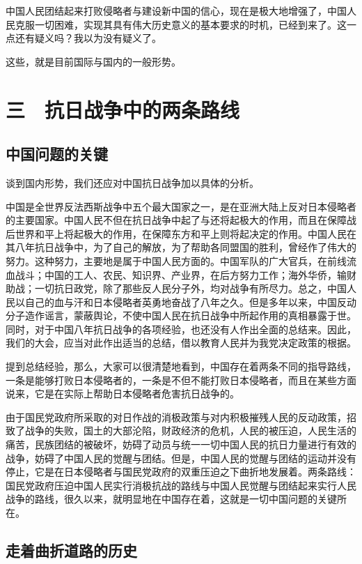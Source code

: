 中国人民团结起来打败侵略者与建设新中国的信心，现在是极大地增强了，中国人民克服一切困难，实现其具有伟大历史意义的基本要求的时机，已经到来了。这一点还有疑义吗？我以为没有疑义了。

这些，就是目前国际与国内的一般形势。

\section{三　抗日战争中的两条路线}

\subsection{中国问题的关键}

谈到国内形势，我们还应对中国抗日战争加以具体的分析。

中国是全世界反法西斯战争中五个最大国家之一，是在亚洲大陆上反对日本侵略者的主要国家。中国人民不但在抗日战争中起了与还将起极大的作用，而且在保障战后世界和平上将起极大的作用，在保障东方和平上则将起决定的作用。中国人民在其八年抗日战争中，为了自己的解放，为了帮助各同盟国的胜利，曾经作了伟大的努力。这种努力，主要地是属于中国人民方面的。中国军队的广大官兵，在前线流血战斗；中国的工人、农民、知识界、产业界，在后方努力工作；海外华侨，输财助战；一切抗日政党，除了那些反人民分子外，均对战争有所尽力。总之，中国人民以自己的血与汗和日本侵略者英勇地奋战了八年之久。但是多年以来，中国反动分子造作谣言，蒙蔽舆论，不使中国人民在抗日战争中所起作用的真相暴露于世。同时，对于中国八年抗日战争的各项经验，也还没有人作出全面的总结来。因此，我们的大会，应当对此作出适当的总结，借以教育人民并为我党决定政策的根据。

提到总结经验，那么，大家可以很清楚地看到，中国存在着两条不同的指导路线，一条是能够打败日本侵略者的，一条是不但不能打败日本侵略者，而且在某些方面说来，它是在实际上帮助日本侵略者危害抗日战争的。

由于国民党政府所采取的对日作战的消极政策与对内积极摧残人民的反动政策，招致了战争的失败，国土的大部沦陷，财政经济的危机，人民的被压迫，人民生活的痛苦，民族团结的被破坏，妨碍了动员与统一一切中国人民的抗日力量进行有效的战争，妨碍了中国人民的觉醒与团结。但是，中国人民的觉醒与团结的运动并没有停止，它是在日本侵略者与国民党政府的双重压迫之下曲折地发展着。两条路线：国民党政府压迫中国人民实行消极抗战的路线与中国人民觉醒与团结起来实行人民战争的路线，很久以来，就明显地在中国存在着，这就是一切中国问题的关键所在。

\subsection{走着曲折道路的历史}

